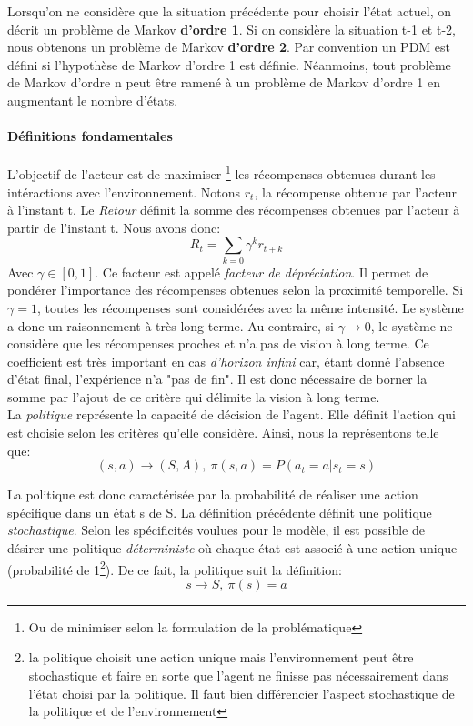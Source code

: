 \noindent Lorsqu'on ne considère que la situation précédente pour choisir l'état actuel, on décrit un problème de Markov \textbf{d'ordre 1}. Si on considère la situation t-1 et t-2, nous obtenons un problème de Markov \textbf{d'ordre 2}. Par convention un PDM est défini si l'hypothèse de Markov d'ordre 1 est définie. Néanmoins, tout problème de Markov d'ordre n peut être ramené à un problème de Markov d'ordre 1 en augmentant le nombre d'états.

\paragraph{Définitions fondamentales}
L'objectif de l'acteur est de maximiser \footnote{Ou de minimiser selon la formulation de la problématique} les récompenses obtenues durant les intéractions avec l'environnement. Notons $r_t$, la récompense obtenue par l'acteur à l'instant t. Le \textit{Retour} définit la somme des récompenses obtenues par l'acteur à partir de l'instant t. Nous avons donc:
$$ R_t=\sum_{k=0}\gamma^k r_{t+k}$$
Avec $\gamma \in [0,1]$. Ce facteur est appelé \textit{facteur de dépréciation}. Il permet de pondérer l'importance des récompenses obtenues selon la proximité temporelle. Si $\gamma=1$, toutes les récompenses sont considérées avec la même intensité. Le système a donc un raisonnement à très long terme. Au contraire, si $\gamma \rightarrow 0$, le système ne considère que les récompenses proches et n'a pas de vision à long terme. Ce coefficient est très important en cas \textit{d'horizon infini} car, étant donné l'absence d'état final, l'expérience n'a "pas de fin". Il est donc nécessaire de borner la somme par l'ajout de ce critère qui délimite la vision à long terme.\\

\noindent La \textit{politique} représente la capacité de décision de l'agent. Elle définit l'action qui est choisie selon les critères qu'elle considère. Ainsi, nous la représentons telle que:
$$ (s,a) \rightarrow (S,A), \  \pi(s,a)=P(a_t=a|s_t=s)$$

\noindent La politique est donc caractérisée par la probabilité de réaliser une action spécifique dans un état s de S. La définition précédente définit une politique \textit{stochastique}. Selon les spécificités voulues pour le modèle, il est possible de désirer une politique \textit{déterministe} où chaque état est associé à une action unique (probabilité de 1\footnote{la politique choisit une action unique mais l'environnement peut être stochastique et faire en sorte que l'agent ne finisse pas nécessairement dans l'état choisi par la politique. Il faut bien différencier l'aspect stochastique de la politique et de l'environnement}). De ce fait, la politique suit la définition:
$$ s \rightarrow S, \ \pi(s)=a$$

